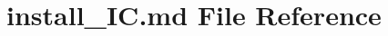 \hypertarget{install___i_c_8md}{}\section{install\+\_\+\+I\+C.\+md File Reference}
\label{install___i_c_8md}
